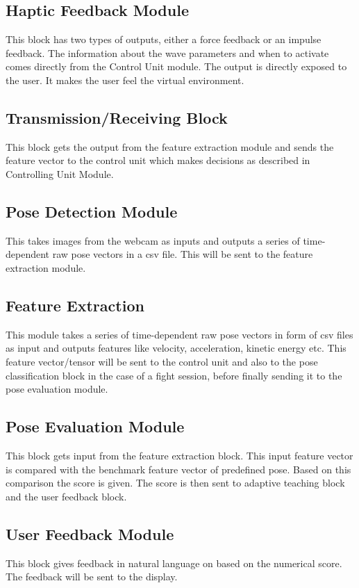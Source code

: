 \subsection{Haptic Feedback Module}
This block has two types of outputs, either a force feedback or an impulse feedback. The information about the wave parameters and when to activate comes directly from the Control Unit module. The output is directly exposed to the user. It makes the user feel the virtual environment.

\subsection{Transmission/Receiving Block}
This block gets the output from the feature extraction module and sends the feature vector to the control unit which makes decisions as described in Controlling Unit Module.

\subsection{Pose Detection Module}
This takes images from the webcam as inputs and outputs a series of time-dependent raw pose vectors in a csv file. This will be sent to the feature extraction module.

\subsection{Feature Extraction}
This module takes a series of time-dependent raw pose vectors in form of csv files as input and outputs features like velocity, acceleration, kinetic energy etc. This feature vector/tensor will be sent to the control unit and also to the pose classification block in the case of a fight session, before finally sending it to the pose evaluation module.

\subsection{Pose Evaluation Module}
This block gets input from the feature extraction block. This input feature vector is compared with the benchmark feature vector of predefined pose. Based on this comparison the score is given. The score is then sent to adaptive teaching block and the user feedback block.

\subsection{User Feedback Module}
This block gives feedback in natural language on based on the numerical score. The feedback will be sent to the display.

